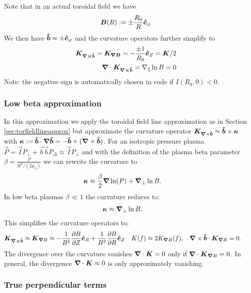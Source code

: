 Note that in an actual toroidal field we have
\begin{align}
  {\boldsymbol{B}}(R) := \pm \frac{R_0}{R} \bm{\hat{e}}_\varphi
  \label{}
\end{align}
We then have $\bm{\hat{b}} = \pm\bm{\hat{e}}_\varphi$ and the curvature operators further
simplify to
\begin{align}
  {\boldsymbol{  K_{{\boldsymbol{\nabla}}\times\bm{\hat{b}}}}} = {\boldsymbol{  K_{{\boldsymbol{\nabla}} B}}} = -\frac{\pm 1}{R_0} \bm{\hat{e}}_Z =
{\boldsymbol{  K}}/2\\
  {\boldsymbol{\nabla}}\cdot{\boldsymbol{ K_{{{\boldsymbol{\nabla}}\times\bm{\hat{b}}}}}}=
    \nabla_\parallel \ln B = 0
    \label{}
\end{align}
Note: the negative sign is automatically chosen in code if $I(R_0, 0)<0$.

\subsubsection{Low beta approximation}\label{sec:lowbetaapprox}
In this approximation we apply the toroidal field line approximation
as in Section
\ref{sec:torfieldlineapprox}
but approximate the curvature operator $ {\boldsymbol{K}}_{{\boldsymbol{\nabla}}\times\bm{\hat{b}}} \approx \bm{\hat{b}}\times{\boldsymbol{\kappa}}$
  with
  ${\boldsymbol{\kappa}} := \bm{\hat{b}} \cdot{\boldsymbol{\nabla}}\bm{\hat{b}} = -\bm{\hat{b}} \times( {\boldsymbol{\nabla}}\times \bm{\hat{b}})$.
For an isotropic pressure plasma \(\vec{P} = \vec{I} P_\perp + \vec{b} \vec{b} P_\Delta \approx \vec{I} P_\perp\) and with the definition of the plasma beta parameter
\(\beta = \frac{P}{B^2/(2 \mu_0) } \)
we can rewrite the curvature to
\begin{align}
    {\boldsymbol{\kappa}} &\approx \frac{\beta}{2} {\boldsymbol{\nabla}} \ln(P) +{\boldsymbol{\nabla}}_{\perp} \ln{B} .
\end{align}
In low beta plasmas \(\beta\ll1\) the curvature reduces to:
\begin{align}
    {\boldsymbol{\kappa}} & \approx {\boldsymbol{\nabla}}_{\perp} \ln{B} .
\end{align}
This simplifies the curvature operators to:
\begin{align}
{\boldsymbol{{K}_{{{\boldsymbol{\nabla}}\times\bm{\hat{b}}}}}} \approx
{\boldsymbol{ {K} }}_{{\boldsymbol{\nabla}}  B}  &\approx  -\frac{1}{B^2}\frac{\partial B}{\partial Z}\bm{\hat{e}}_R +\frac{1}{B^2} \frac{\partial B}{\partial R}\bm{\hat{e}}_Z &
{K} (f) &\approx 2{K}_{{\boldsymbol{\nabla}}  B} (f) , &
    {\boldsymbol{\nabla}}\times\bm{\hat{b}} \cdot {\boldsymbol{{K}}}_{{\boldsymbol{\nabla}}  B} &= 0.
\end{align}
The divergence over the curvature vanishes \( {\boldsymbol{\nabla}}\cdot {\boldsymbol{ {K} }} = 0\) only if \( {\boldsymbol{\nabla}}\cdot {\boldsymbol{ {K}}}_{{\boldsymbol{\nabla}}  B}   = 0\).
In general, the divergence \( {\boldsymbol{\nabla}}\cdot {\boldsymbol{ {K} }} \approx 0\) is only approximately vanishing.
\subsubsection{True perpendicular terms} \label{sec:trueapprox}


